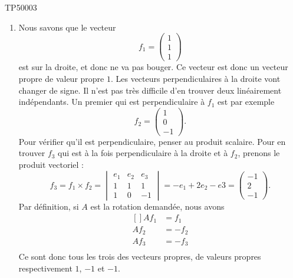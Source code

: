 \begin{corrige}{TP50003}

	\begin{enumerate}

		\item
		      Nous savons que le vecteur
		      \begin{equation}
			      f_1=\begin{pmatrix}
				      1 \\
				      1 \\
				      1
			      \end{pmatrix}
		      \end{equation}
		      est sur la droite, et donc ne va pas bouger. Ce vecteur est donc un vecteur propre de valeur propre $1$. Les vecteurs perpendiculaires à la droite vont changer de signe. Il n'est pas très difficile d'en trouver deux linéairement indépendants. Un premier qui est perpendiculaire à $f_1$ est par exemple
		      \begin{equation}
			      f_2=\begin{pmatrix}
				      1 \\
				      0 \\
				      -1
			      \end{pmatrix}.
		      \end{equation}
		      Pour vérifier qu'il est perpendiculaire, penser au produit scalaire. Pour en trouver $f_3$ qui est à la fois perpendiculaire à la droite et à $f_2$, prenons le produit vectoriel :
		      \begin{equation}
			      f_3=f_1\times f_2=\begin{vmatrix}
				      e_1 & e_2 & e_3 \\
				      1   & 1   & 1   \\
				      1   & 0   & -1
			      \end{vmatrix}=-e_1+2e_2-e3=\begin{pmatrix}
				      -1 \\
				      2  \\
				      -1
			      \end{pmatrix}.
		      \end{equation}
		      Par définition, si $A$ est la rotation demandée, nous avons
		      \begin{equation}
			      \begin{aligned}[]
				      Af_1 & =f_1  \\
				      Af_2 & =-f_2 \\
				      Af_3 & =-f_3 \\
			      \end{aligned}
		      \end{equation}
		      Ce sont donc tous les trois des vecteurs propres, de valeurs propres respectivement $1$, $-1$ et $-1$.


\end{enumerate}
\end{corrige}
